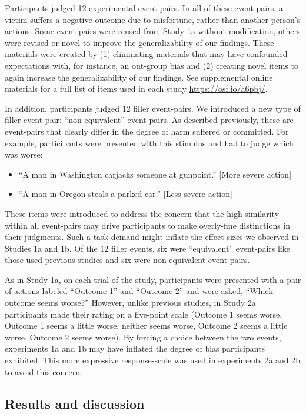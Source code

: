 \documentclass[10pt, letterpaper]{article}
\begin{document}
Participants judged 12 experimental event-pairs. In all of these
event-pairs, a victim suffers a negative outcome due to misfortune,
rather than another person's actions. Some event-pairs were reused from
Study 1a without modification, others were revised or novel to improve
the generalizability of our findings. These materials were created by
(1) eliminating materials that may have confounded expectations with,
for instance, an out-group bias and (2) creating novel items to again
increase the generalizability of our findings. See supplemental online
materials for a full list of items used in each study
\url{https://osf.io/a6pbj/}.

In addition, participants judged 12 filler event-pairs. We introduced a
new type of filler event-pair: ``non-equivalent'' event-pairs. As
described previously, these are event-pairs that clearly differ in the
degree of harm suffered or committed. For example, participants were
presented with this stimulus and had to judge which was worse:

\begin{itemize}
\item
  ``A man in Washington carjacks someone at gunpoint.'' {[}More severe
  action{]}
\item
  ``A man in Oregon steals a parked car.'' {[}Less severe action{]}
\end{itemize}

These items were introduced to address the concern that the high
similarity within all event-pairs may drive participants to make
overly-fine distinctions in their judgments. Such a task demand might
inflate the effect sizes we observed in Studies 1a and 1b. Of the 12
filler events, six were ``equivalent'' event-pairs like those used
previous studies and six were non-equivalent event pairs.

As in Study 1a, on each trial of the study, participants were presented
with a pair of actions labeled ``Outcome 1'' and ``Outcome 2'' and were
asked, ``Which outcome seems worse?'' However, unlike previous studies,
in Study 2a participants made their rating on a five-point scale
(Outcome 1 seems worse, Outcome 1 seems a little worse, neither seems
worse, Outcome 2 seems a little worse, Outcome 2 seems worse). By
forcing a choice between the two events, experiments 1a and 1b may have
inflated the degree of bias participants exhibited. This more expressive
response-scale was used in experiments 2a and 2b to avoid this concern.

\subsection{Results and discussion}\label{results-and-discussion-2}
\end{document}
